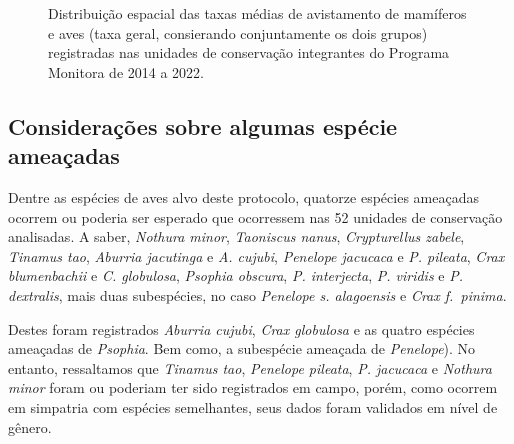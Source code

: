 \documentclass[
  letterpaper,
]{scrbook}
\begin{document}
\begin{figure}[H]


\caption{\label{fig-taxa-encontro-mapa}Distribuição espacial das taxas
médias de avistamento de mamíferos e aves (taxa geral, consierando
conjuntamente os dois grupos) registradas nas unidades de conservação
integrantes do Programa Monitora de 2014 a 2022.}

\end{figure}%

\subsection{Considerações sobre algumas espécie
ameaçadas}\label{considerauxe7uxf5es-sobre-algumas-espuxe9cie-ameauxe7adas}

Dentre as espécies de aves alvo deste protocolo, quatorze espécies
ameaçadas ocorrem ou poderia ser esperado que ocorressem nas 52 unidades
de conservação analisadas. A saber, \emph{Nothura minor},
\emph{Taoniscus nanus}, \emph{Crypturellus zabele}, \emph{Tinamus tao},
\emph{Aburria jacutinga} e \emph{A. cujubi}, \emph{Penelope jacucaca} e
\emph{P. pileata}, \emph{Crax blumenbachii} e \emph{C. globulosa},
\emph{Psophia obscura}, \emph{P. interjecta}, \emph{P. viridis} e
\emph{P. dextralis}, mais duas subespécies, no caso \emph{Penelope s.
alagoensis} e \emph{Crax f.~pinima}.

Destes foram registrados \emph{Aburria cujubi}, \emph{Crax globulosa} e
as quatro espécies ameaçadas de \emph{Psophia}. Bem como, a subespécie
ameaçada de \emph{Penelope}). No entanto, ressaltamos que \emph{Tinamus
tao}, \emph{Penelope pileata}, \emph{P. jacucaca} e \emph{Nothura minor}
foram ou poderiam ter sido registrados em campo, porém, como ocorrem em
simpatria com espécies semelhantes, seus dados foram validados em nível
de gênero.
\end{document}
